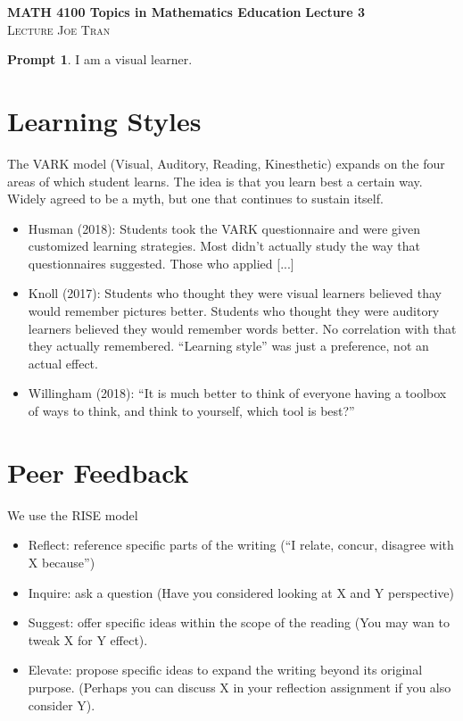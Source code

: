 \documentclass[11pt]{article}
\theoremstyle{theorem}\newtheorem*{task}{Task}
\theoremstyle{theorem}\newtheorem*{example}{Example}
\theoremstyle{theorem}\newtheorem*{answer}{Answer}
\theoremstyle{definition}\newtheorem*{solution}{Solution}
\theoremstyle{theorem}\newtheorem*{prompt}{Prompt}
\theoremstyle{theorem}\newtheorem*{question}{Question}
\begin{document}
\noindent \textbf{MATH 4100 Topics in Mathematics Education} \hfill \textbf{Lecture 3} \\
\textsc{Lecture} \hfill \textsc{Joe Tran}

\begin{prompt}
    I am a visual learner.
\end{prompt}

\section{Learning Styles}

The VARK model (Visual, Auditory, Reading, Kinesthetic) expands on the four areas of which student learns. The idea is that you learn best a certain way. Widely agreed to be a myth, but one that continues to sustain itself.
\begin{itemize}
    \item Husman (2018): Students took the VARK questionnaire and were given customized learning strategies. Most didn't actually study the way that questionnaires suggested. Those who applied [...]
    \item Knoll (2017): Students who thought they were visual learners believed thay would remember pictures better. Students who thought they  were auditory learners believed they would remember words better. No correlation with that they actually remembered. ``Learning style'' was just a preference, not an actual effect.
    \item Willingham (2018): ``It is much better to think of everyone having a toolbox of ways to think, and think to yourself, which tool is best?''
\end{itemize}

\section{Peer Feedback}

We use the RISE model
\begin{itemize}
    \item Reflect: reference specific parts of the writing (``I relate, concur, disagree with X because'')
    \item Inquire: ask a question (Have you considered looking at X and Y perspective)
    \item Suggest: offer specific ideas within the scope of the reading (You may wan to tweak X for Y effect).
    \item Elevate: propose specific ideas to expand the writing beyond its original purpose. (Perhaps you can discuss X in your reflection assignment if you also consider Y).
\end{itemize}
\end{document}
